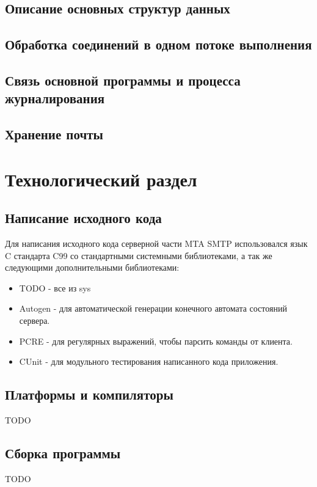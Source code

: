 \documentclass[a4paper,12pt]{report}
\begin{document}
\section{Описание основных структур данных}

\section{Обработка соединений в одном потоке выполнения}

\section{Связь основной программы и процесса журналирования}

\section{Хранение почты}

\chapter{Технологический раздел}

\section{Написание исходного кода}

Для написания исходного кода серверной части MTA SMTP использовался язык C стандарта C99 со стандартными системными библиотеками, а так же следующими дополнительными библиотеками:
\begin{itemize}
    \item TODO - все из sys 
    \item Autogen - для автоматической генерации конечного автомата состояний сервера.
    \item PCRE - для регулярных выражений, чтобы парсить команды от клиента.
    \item CUnit - для модульного тестирования написанного кода приложения.
\end{itemize}


\section{Платформы и компиляторы}

TODO

\section{Сборка программы}
TODO
\end{document}
